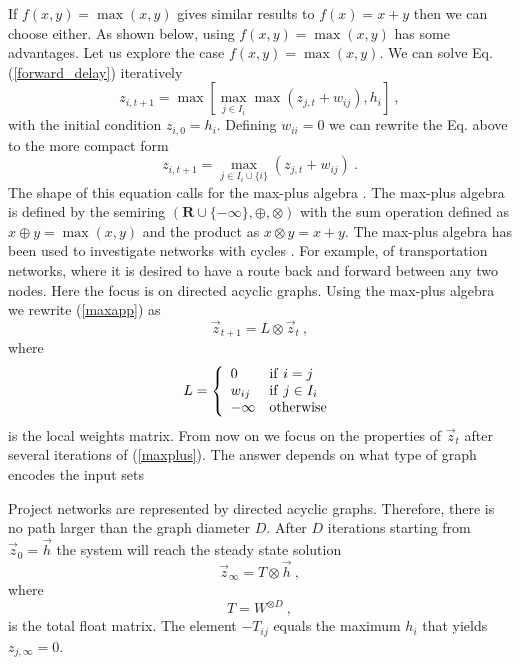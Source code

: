 \documentclass[reprint,aps,prl,amsmath,amssymb,superscriptaddress,showpacs]{revtex4-1}
\begin{document}
If $f(x,y)=\max(x,y)$ gives similar results to $f(x)=x+y$ then we can choose either. As shown below, using  $f(x,y)=\max(x,y)$ has some advantages. Let us explore the case $f(x,y)=\max(x,y)$. We can solve Eq. (\ref{forward_delay}) iteratively
%
\begin{equation}
z_{i,t+1} = \max\left[ \max_{j\in I_i} \max(z_{j,t} + w_{ij}), h_i\right]\ ,
\label{forward_delay_iter} 
\end{equation}
%
with the initial condition $z_{i,0}=h_i$. Defining $w_{ii}=0$ we can rewrite the Eq. above to the more compact form
%
\begin{equation}
z_{i,t+1} = \max_{j\in I_i\cup\{i\}} ( z_{j,t} + w_{ij})\ .
\label{maxapp}
\end{equation}
%
The shape of this equation calls for the max-plus algebra \cite{butkovic10}. The max-plus algebra is defined by the semiring $(\mathbf{R}\cup\{-\infty\},\oplus,\otimes)$ with the sum operation defined as
$x\oplus y = \max(x,y)$ and the product as $x\otimes y = x+y$. The max-plus algebra has been used to investigate networks with cycles \cite{hei14}. For example, of transportation networks, where it is desired to have a route back and forward between any two nodes. Here the focus is on directed acyclic graphs. Using the max-plus algebra we rewrite  (\ref{maxapp}) as
%
\begin{equation}
\vec{z}_{t+1} = L\otimes \vec{z}_t\ ,
\label{maxplus} 
\end{equation}
%
where
%
\begin{equation}
L = \left\{
\begin{array}{ll}
0 & {\rm if}\ i=j\\
w_{ij} & {\rm if}\ j\in I_i\\
-\infty & {\rm otherwise}
\end{array}\right.
\label{L}
\end{equation}
%
is the local weights matrix. From now on we focus on the properties of $\vec{z}_t$ after several iterations of (\ref{maxplus}). The answer depends on what type of graph encodes the input sets 

Project networks are represented by directed acyclic graphs. Therefore, there is no path larger than the graph diameter $D$. After $D$ iterations starting from $\vec{z}_0=\vec{h}$ the system will reach the steady state solution
%
\begin{equation}
\vec{z}_{\infty} = T\otimes \vec{h}\ ,
\label{maxplus_oo} 
\end{equation}
%
where
%
\begin{equation}
T = W^{\otimes D}\ ,
\label{T}
\end{equation}
%
is the total float matrix. The element $-T_{ij}$ equals the maximum $h_i$ that yields $z_{j,\infty}=0$.
\end{document}
